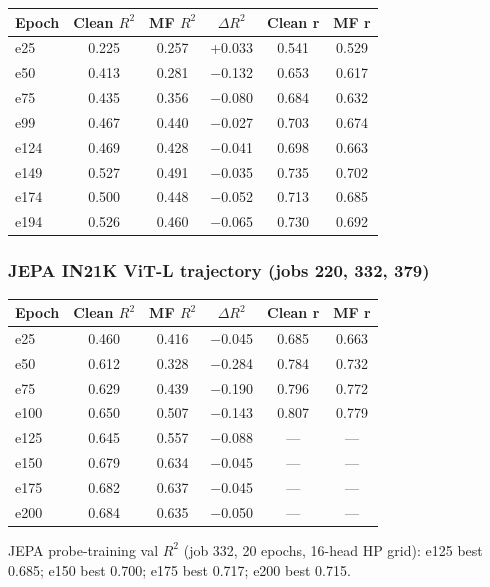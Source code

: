 \documentclass{article}
\begin{document}
\begin{center}
\begin{tabular}{lccccc}
\toprule
Epoch & Clean $R^2$ & MF $R^2$ & $\Delta R^2$ & Clean r & MF r \\
\midrule
e25  & 0.225 & 0.257 & +0.033 & 0.541 & 0.529 \\
e50  & 0.413 & 0.281 & $-$0.132 & 0.653 & 0.617 \\
e75  & 0.435 & 0.356 & $-$0.080 & 0.684 & 0.632 \\
e99  & 0.467 & 0.440 & $-$0.027 & 0.703 & 0.674 \\
e124 & 0.469 & 0.428 & $-$0.041 & 0.698 & 0.663 \\
e149 & 0.527 & 0.491 & $-$0.035 & 0.735 & 0.702 \\
e174 & 0.500 & 0.448 & $-$0.052 & 0.713 & 0.685 \\
e194 & 0.526 & 0.460 & $-$0.065 & 0.730 & 0.692 \\
\bottomrule
\end{tabular}
\end{center}

\subsubsection{JEPA IN21K ViT-L trajectory (jobs 220, 332, 379)}

\begin{center}
\begin{tabular}{lccccc}
\toprule
Epoch & Clean $R^2$ & MF $R^2$ & $\Delta R^2$ & Clean r & MF r \\
\midrule
e25  & 0.460 & 0.416 & $-$0.045 & 0.685 & 0.663 \\
e50  & 0.612 & 0.328 & $-$0.284 & 0.784 & 0.732 \\
e75  & 0.629 & 0.439 & $-$0.190 & 0.796 & 0.772 \\
e100 & 0.650 & 0.507 & $-$0.143 & 0.807 & 0.779 \\
e125 & 0.645 & 0.557 & $-$0.088 & --- & --- \\
e150 & 0.679 & 0.634 & $-$0.045 & --- & --- \\
e175 & 0.682 & 0.637 & $-$0.045 & --- & --- \\
e200 & 0.684 & 0.635 & $-$0.050 & --- & --- \\
\bottomrule
\end{tabular}
\end{center}

JEPA probe-training val $R^2$ (job 332, 20 epochs, 16-head HP grid):
e125 best 0.685; e150 best 0.700; e175 best 0.717; e200 best 0.715.
\end{document}
